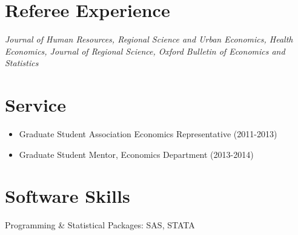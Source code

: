 \documentclass[margin,line]{res}
\begin{document}
\begin{resume}

\section{\sc Referee Experience}

\textit{Journal of Human Resources, Regional Science and Urban Economics, Health Economics, Journal of Regional Science, Oxford Bulletin of Economics and Statistics}
\vspace{.02in}
\section{\sc Service}

\begin{itemize}
 \setlength{\itemsep}{0cm}%
  \setlength{\parskip}{0cm}%
	\item Graduate Student Association Economics Representative (2011-2013)
	\item Graduate Student Mentor, Economics Department (2013-2014)
\end{itemize}

\section{\sc Software Skills} Programming \& Statistical Packages: SAS, STATA


\end{resume}
\end{document}
